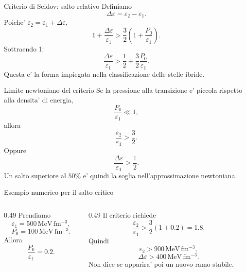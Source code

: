 \begin{frame}{Criterio di Seidov: salto relativo}
\small
Definiamo
\[
\Delta\varepsilon=\varepsilon_2-\varepsilon_1.
\]
Poiche' $\varepsilon_2=\varepsilon_1+\Delta\varepsilon$,
\[
1+\frac{\Delta\varepsilon}{\varepsilon_1}>
\frac32\left(1+\frac{P_0}{\varepsilon_1}\right).
\]
Sottraendo 1:
\[
{
\frac{\Delta\varepsilon}{\varepsilon_1}>
\frac12+\frac32\frac{P_0}{\varepsilon_1}.}
\]
Questa e' la forma impiegata nella classificazione delle stelle ibride.
\end{frame}

\begin{frame}{Limite newtoniano del criterio}
\small
Se la pressione alla transizione e' piccola
rispetto alla densita' di energia,
\[
\frac{P_0}{\varepsilon_1}\ll1,
\]
allora
\[
{\frac{\varepsilon_2}{\varepsilon_1}>\frac32.}
\]
Oppure
\[
{\frac{\Delta\varepsilon}{\varepsilon_1}>\frac12.}
\]
Un salto superiore al $50\%$ e' quindi la soglia
nell'approssimazione newtoniana.
\end{frame}

\begin{frame}{Esempio numerico per il salto critico}
\small
\begin{columns}[T,onlytextwidth]
\begin{column}{0.49\textwidth}
Prendiamo
\[
\varepsilon_1=500\,\mathrm{MeV\,fm^{-3}},
\]
\[
P_0=100\,\mathrm{MeV\,fm^{-3}}.
\]
Allora
\[
\frac{P_0}{\varepsilon_1}=0.2.
\]
\end{column}
\begin{column}{0.49\textwidth}
Il criterio richiede
\[
\frac{\varepsilon_2}{\varepsilon_1}>
\frac32(1+0.2)=1.8.
\]
Quindi
\[
\varepsilon_2>900\,\mathrm{MeV\,fm^{-3}},
\]
\[
\Delta\varepsilon>400\,\mathrm{MeV\,fm^{-3}}.
\]
Non dice se apparira' poi un nuovo ramo stabile.
\end{column}
\end{columns}
\end{frame}

